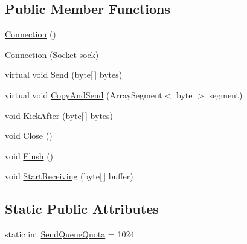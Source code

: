\subsection*{Public Member Functions}
\begin{DoxyCompactItemize}
\item 
\hyperlink{class_o_t_a_1_1_sockets_1_1_connection_a65a4d3be6c7306312274d09df54b12c6}{Connection} ()
\item 
\hyperlink{class_o_t_a_1_1_sockets_1_1_connection_a92571651b07acb0a0a40790a0ce9b42d}{Connection} (Socket sock)
\item 
virtual void \hyperlink{class_o_t_a_1_1_sockets_1_1_connection_ad9d946716d3b5d1c34b53f75b30d06cd}{Send} (byte\mbox{[}$\,$\mbox{]} bytes)
\item 
virtual void \hyperlink{class_o_t_a_1_1_sockets_1_1_connection_abfb481ac75c16936ce9dfd7805ecb121}{Copy\+And\+Send} (Array\+Segment$<$ byte $>$ segment)
\item 
void \hyperlink{class_o_t_a_1_1_sockets_1_1_connection_a982f31b082835b57e0ab783a481f5cb8}{Kick\+After} (byte\mbox{[}$\,$\mbox{]} bytes)
\item 
void \hyperlink{class_o_t_a_1_1_sockets_1_1_connection_a4dc9077f7652b898bc8dc64bd6191690}{Close} ()
\item 
void \hyperlink{class_o_t_a_1_1_sockets_1_1_connection_af631cf1a0e801516e2fb5f4af2c9cc0e}{Flush} ()
\item 
void \hyperlink{class_o_t_a_1_1_sockets_1_1_connection_a2ffd866e13e97c37184f653381e359c4}{Start\+Receiving} (byte\mbox{[}$\,$\mbox{]} buffer)
\end{DoxyCompactItemize}
\subsection*{Static Public Attributes}
\begin{DoxyCompactItemize}
\item 
static int \hyperlink{class_o_t_a_1_1_sockets_1_1_connection_a13a2c9c2e308c32b4b42f0efa4874ec8}{Send\+Queue\+Quota} = 1024
\end{DoxyCompactItemize}
